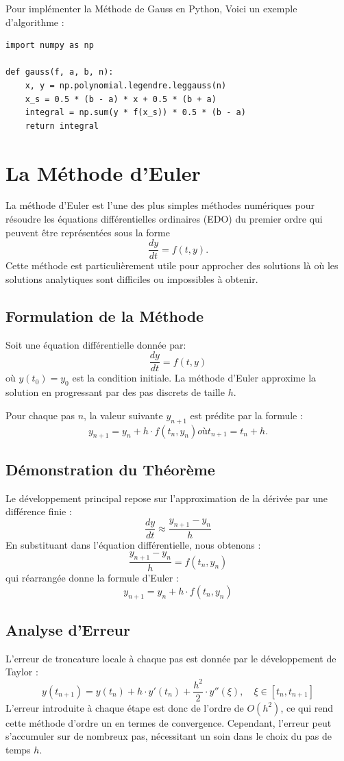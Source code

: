 \documentclass[12pt,a4paper]{article}
\begin{document}
Pour implémenter la Méthode de Gauss en Python, Voici un exemple d'algorithme :
\begin{lstlisting}
import numpy as np

def gauss(f, a, b, n):
    x, y = np.polynomial.legendre.leggauss(n)
    x_s = 0.5 * (b - a) * x + 0.5 * (b + a)
    integral = np.sum(y * f(x_s)) * 0.5 * (b - a)
    return integral
\end{lstlisting}

\newpage

\section{La Méthode d'Euler}
La méthode d'Euler est l'une des plus simples méthodes numériques pour résoudre les équations différentielles ordinaires (EDO) du premier ordre qui peuvent être représentées sous la forme
\[
\frac{dy}{dt} = f(t, y).
\]
Cette méthode est particulièrement utile pour approcher des solutions là où les solutions analytiques sont difficiles ou impossibles à obtenir.

\subsection{Formulation de la Méthode}
Soit une équation différentielle donnée par:
\[
\frac{dy}{dt} = f(t, y)
\]
où $y(t_0) = y_0$ est la condition initiale. La méthode d'Euler approxime la solution en progressant par des pas discrets de taille $h$.

Pour chaque pas $n$, la valeur suivante $y_{n+1}$ est prédite par la formule :
\[
y_{n+1} = y_n + h \cdot f(t_n, y_n) où t_{n+1} = t_n + h.
\]


\subsection{Démonstration du Théorème}
Le développement principal repose sur l'approximation de la dérivée par une différence finie :
\[
\frac{dy}{dt} \approx \frac{y_{n+1} - y_n}{h}
\]
En substituant dans l'équation différentielle, nous obtenons :
\[
\frac{y_{n+1} - y_n}{h} = f(t_n, y_n)
\]
qui réarrangée donne la formule d'Euler :
\[
y_{n+1} = y_n + h \cdot f(t_n, y_n)
\]

\subsection{Analyse d'Erreur}
L'erreur de troncature locale à chaque pas est donnée par le développement de Taylor :
\[
y(t_{n+1}) = y(t_n) + h \cdot y'(t_n) + \frac{h^2}{2} \cdot y''(\xi), \quad \xi \in [t_n, t_{n+1}]
\] 
L'erreur introduite à chaque étape est donc de l'ordre de $O(h^2)$, ce qui rend cette méthode d'ordre un en termes de convergence. Cependant, l'erreur peut s'accumuler sur de nombreux pas, nécessitant un soin dans le choix du pas de temps $h$.
\end{document}
